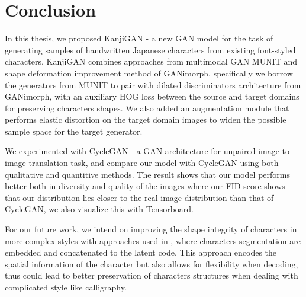 \documentclass[12pt]{report}
\begin{document}
\chapter{Conclusion}
\label{chap:conclusion}

In this thesis, we proposed KanjiGAN - a new GAN model for the task of generating samples of handwritten Japanese characters from existing font-styled characters. KanjiGAN combines approaches from multimodal GAN MUNIT\cite{munit} and shape deformation improvement method of GANimorph\cite{ganimorph}, specifically we borrow the generators from MUNIT to pair with dilated discriminators architecture from GANimorph, with an auxiliary HOG loss between the source and target domains for preserving characters shapes. We also added an augmentation module that performs elastic distortion on the target domain images to widen the possible sample space for the target generator.

We experimented with CycleGAN - a GAN architecture for unpaired image-to-image translation task, and compare our model with CycleGAN using both qualitative and quantitive methods. The result shows that our model performs better both in diversity and quality of the images where our FID score shows that our distribution lies closer to the real image distribution than that of CycleGAN, we also visualize this with Tensorboard.

For our future work, we intend on improving the shape integrity of characters in more complex styles with approaches used in \cite{dense-ran}\cite{calligan}, where characters segmentation are embedded and concatenated to the latent code. This approach encodes the spatial information of the character but also allows for flexibility when decoding, thus could lead to better preservation of characters structures when dealing with complicated style like calligraphy. 
\end{document}
